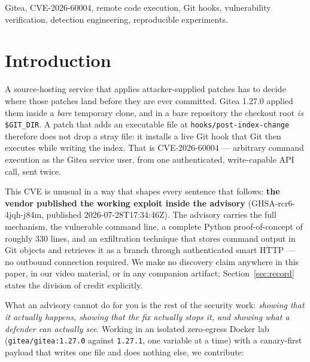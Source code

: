 \documentclass[journal]{IEEEtran}
\begin{document}
\begin{IEEEkeywords}
Gitea, CVE-2026-60004, remote code execution, Git hooks, vulnerability
verification, detection engineering, reproducible experiments.
\end{IEEEkeywords}

\section{Introduction}
\label{sec:intro}

A source-hosting service that applies attacker-supplied patches has to decide
where those patches land before they are ever committed. Gitea 1.27.0 applied
them inside a \emph{bare} temporary clone, and in a bare repository the
checkout root \emph{is} \texttt{\$GIT\_DIR}. A patch that adds an executable
file at \texttt{hooks/post-index-change} therefore does not drop a stray file:
it installs a live Git hook that Git then executes while writing the index.
That is CVE-2026-60004 --- arbitrary command execution as the Gitea service
user, from one authenticated, write-capable API call, sent twice.

This CVE is unusual in a way that shapes every sentence that follows:
\textbf{the vendor published the working exploit inside the advisory}
(GHSA-rcr6-4jqh-j84m, published 2026-07-28T17:34:46Z). The advisory carries the
full mechanism, the vulnerable command line, a complete Python
proof-of-concept of roughly 330 lines, and an exfiltration technique that
stores command output in Git objects and retrieves it as a branch through
authenticated smart HTTP --- no outbound connection required. We make no
discovery claim anywhere in this paper, in our video material, or in any
companion artifact; Section~\ref{sec:record} states the division of credit
explicitly.

What an advisory cannot do for you is the rest of the security work:
\emph{showing that it actually happens, showing that the fix actually stops
it, and showing what a defender can actually see}. Working in an isolated
zero-egress Docker lab (\texttt{gitea/gitea:1.27.0} against \texttt{1.27.1},
one variable at a time) with a canary-first payload that writes one file and
does nothing else, we contribute:
\end{document}

